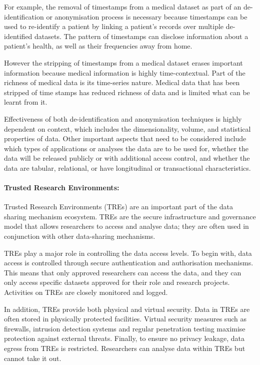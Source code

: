 \documentclass[11pt]{article}
\begin{document}
For example, the removal of timestamps from a medical dataset as part of an de-identification or anonymisation process is necessary because timestamps can be used to re-identify a patient by linking a patient's records over multiple de-identified datasets. The pattern of timestamps can disclose information about a patient's health, as well as their frequencies away from home.

However the stripping of timestamps from a medical dataset erases important information because medical information is highly time-contextual. Part of the richness of medical data is its time-series nature. Medical data that has been stripped of time stamps has reduced richness of data and is limited what can be learnt from it. 

Effectiveness of both de-identification and anonymisation techniques is highly dependent on context, which includes the dimensionality, volume, and statistical properties of data. Other important aspects that need to be considered include which types of applications or analyses the data are to be used for, whether the data will be released publicly or with additional access control, and whether the data are tabular, relational, or have longitudinal or transactional characteristics.

\paragraph{Trusted Research Environments:}

Trusted Research Environments (TREs) are an important part of the data sharing mechanism ecosystem. TREs are the secure infrastructure and governance model that allows researchers to access and analyse data; they are often used in conjunction with other data-sharing mechanisms.

TREs play a major role in controlling the data access levels. To begin with, data access is controlled through secure authentication and authorisation mechanisms. This means that only approved researchers can access the data, and they can only access specific datasets approved for their role and research projects. Activities on TREs are closely monitored and logged.

In addition, TREs provide both physical and virtual security. Data in TREs are often stored in physically protected facilities. Virtual security measures such as firewalls, intrusion detection systems and regular penetration testing maximise protection against external threats.  Finally, to ensure no privacy leakage, data egress from TREs is restricted. Researchers can analyse data within TREs but cannot take it out.
\end{document}
